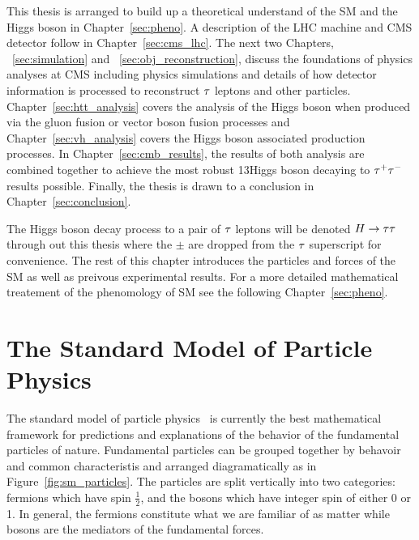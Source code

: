 This thesis is arranged to build up a theoretical understand of the SM and the
Higgs boson in Chapter~\ref{sec:pheno}. A description of the LHC machine and
CMS detector follow in Chapter~\ref{sec:cms_lhc}. The next two Chapters, ~\ref{sec:simulation} and
~\ref{sec:obj_reconstruction}, discuss the foundations of physics analyses at CMS including physics
simulations and details of how detector information is processed to reconstruct $\tau$
leptons and other particles. Chapter~\ref{sec:htt_analysis} covers the analysis
of the Higgs boson when produced via the gluon fusion or vector boson fusion
processes and Chapter~\ref{sec:vh_analysis} covers the Higgs boson associated
production processes. In Chapter~\ref{sec:cmb_results}, the results of
both analysis are combined together to achieve the most robust 13\TeV Higgs
boson decaying to $\tau^{+}\tau^{-}$ results possible. Finally, the thesis
is drawn to a conclusion in Chapter~\ref{sec:conclusion}.

The Higgs boson decay process to a pair of $\tau$ leptons will be denoted
$H\to\tau\tau$ through out this thesis where the $\pm$ are dropped from the $\tau$ superscript
for convenience.
The rest of this chapter introduces the particles and forces of the SM as well
as preivous experimental results. For a more detailed mathematical treatement
of the phenomology of SM see the following Chapter~\ref{sec:pheno}.


\section{The Standard Model of Particle Physics}
The standard model of particle physics~\cite{Glashow:1961tr,SM1,SM3} is currently
the best mathematical framework for predictions and explanations of the behavior
of the fundamental particles of nature. Fundamental particles can be grouped
together by behavoir and common characteristis and arranged diagramatically as in
Figure~\ref{fig:sm_particles}. The particles are split vertically into two categories:
fermions which have spin $\frac{1}{2}$, and the bosons which have integer
spin of either 0 or 1. In general, the fermions constitute what we are familiar of
as matter while bosons are the mediators of the fundamental forces.

